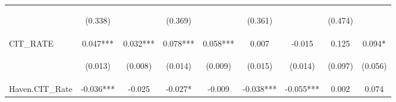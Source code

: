 \begin{center}
\begin{tabular}{lcccccccc}
\vspace{4pt} & \begin{footnotesize}(0.338)\end{footnotesize} & \begin{footnotesize}\end{footnotesize} & \begin{footnotesize}(0.369)\end{footnotesize} & \begin{footnotesize}\end{footnotesize} & \begin{footnotesize}(0.361)\end{footnotesize} & \begin{footnotesize}\end{footnotesize} & \begin{footnotesize}(0.474)\end{footnotesize} & \begin{footnotesize}\end{footnotesize} \\
CIT\_RATE & 0.047*** & 0.032*** & 0.078*** & 0.058*** & 0.007 & -0.015 & 0.125 & 0.094* \\
\vspace{4pt} & \begin{footnotesize}(0.013)\end{footnotesize} & \begin{footnotesize}(0.008)\end{footnotesize} & \begin{footnotesize}(0.014)\end{footnotesize} & \begin{footnotesize}(0.009)\end{footnotesize} & \begin{footnotesize}(0.015)\end{footnotesize} & \begin{footnotesize}(0.014)\end{footnotesize} & \begin{footnotesize}(0.097)\end{footnotesize} & \begin{footnotesize}(0.056)\end{footnotesize} \\
Haven.CIT\_Rate & -0.036*** & -0.025 & -0.027* & -0.009 & -0.038*** & -0.055*** & 0.002 & 0.074 \\

\end{tabular}
\end{center}
